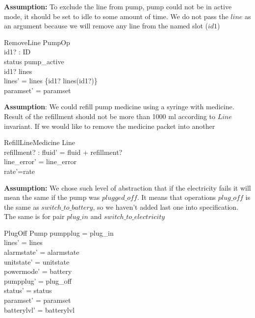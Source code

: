 \documentclass{article}
\begin{document}
	
\textbf{Assumption:} To exclude the line from pump, pump could not be in active mode, it should be set to idle to some amount of time. We do not pass the $line$ as an argument because we will remove any line from the named slot ($id1$)

	\begin{schema}{RemoveLine}
		PumpOp \\
		id1? : ID \\
	\where
		status \neq pump\_active \\
		id1? \in \dom lines \\
		lines' = lines \setminus \{id1? \mapsto lines(id1?)\} \\
    	paramset' = paramset\\ 	
	\end{schema}
	

\textbf{Assumption}: We could refill pump medicine using a syringe with medicine. Result of the refillment should not be more than 1000 ml according to $Line$ invariant.
If we would like to remove the medicine packet into another 

	\begin{schema}{RefillLineMedicine}
		\Delta Line \\
		refillment? : \nat
	\where
	    fluid' = fluid + refillment? \\
		line\_error' = line\_error \\
		rate'=rate
	\end{schema}
	
	

\textbf{Assumption:} We chose such level of abstraction that if the electricity fails it will mean the same if the pump was $plugged\_off$. It means that operations $plug\_off$ is the same as $switch\_to\_battery$, so we haven't added last one into specification. The same is for pair $plug\_in$ and $switch\_to\_electricity$

		
	\begin{schema}{PlugOff}
		\Delta Pump		
	\where
		pumpplug = plug\_in \\		
		lines' = lines  \\
    	alarmstate' = alarmstate \\
    	unitstate' = unitstate \\
    	powermode' = battery \\
    	pumpplug' = plug\_off \\
    	status' = status \\		
		paramset' = paramset\\
		batterylvl' = batterylvl		
	\end{schema}
	
\end{document}
